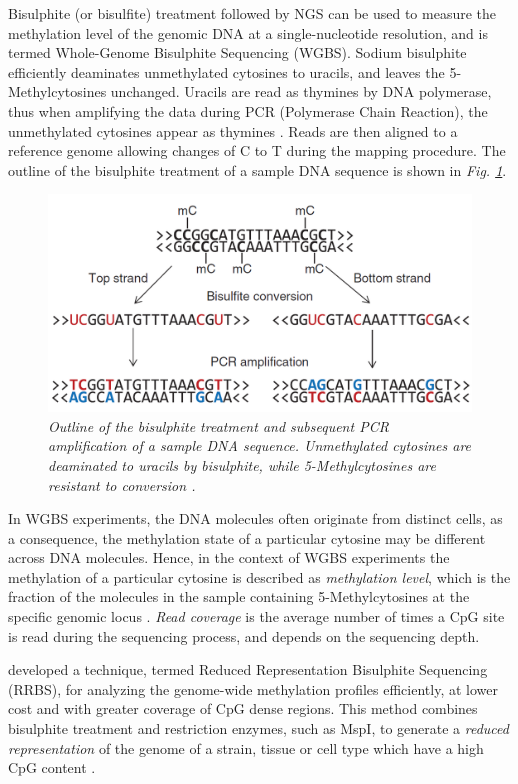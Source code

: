 Bisulphite (or bisulfite) treatment \citep{Frommer1992} followed by NGS can be used to measure the methylation level of the genomic DNA at a single-nucleotide resolution, and is termed Whole-Genome Bisulphite Sequencing (WGBS). Sodium bisulphite efficiently deaminates unmethylated cytosines to uracils, and leaves the 5-Methylcytosines unchanged. Uracils are read as thymines by DNA polymerase, thus when amplifying the data during PCR (Polymerase Chain Reaction), the unmethylated cytosines appear as thymines \citep{Krueger2012}. Reads are then aligned to a reference genome allowing changes of C to T during the mapping procedure. 
The outline of the bisulphite treatment of a sample DNA sequence is shown in \emph{Fig. \ref{bisulphite-pic}}.
\begin{figure}[!ht]
	\begin{center}
 		\includegraphics[scale = 0.4]{images/bis-treatment.png}
		\caption{\emph{Outline of the bisulphite treatment and subsequent PCR amplification of a sample DNA sequence. Unmethylated cytosines are deaminated to uracils by bisulphite, while 5-Methylcytosines are resistant to conversion \citep{Krueger2012}.}}
		\label{bisulphite-pic}
	\end{center}
\end{figure} 

In WGBS experiments, the DNA molecules often originate from distinct cells, as a consequence, the methylation state of a particular cytosine may be different across DNA molecules. Hence, in the context of WGBS experiments the methylation of a particular cytosine is described as \emph{methylation level}, which is the fraction of the molecules in the sample containing 5-Methylcytosines at the specific genomic locus \citep{Schultz2012}. \emph{Read coverage} is the average number of times a CpG site is read during the sequencing process, and depends on the sequencing depth.

\cite{Meissner2005} developed a technique, termed Reduced Representation Bisulphite Sequencing (RRBS), for analyzing the genome-wide methylation profiles efficiently, at lower cost and with greater coverage of CpG dense regions. This method combines bisulphite treatment and restriction enzymes, such as MspI, to generate a \emph{reduced representation} of the genome of a strain, tissue or cell type which have a high CpG content \citep{Meissner2005}. 

